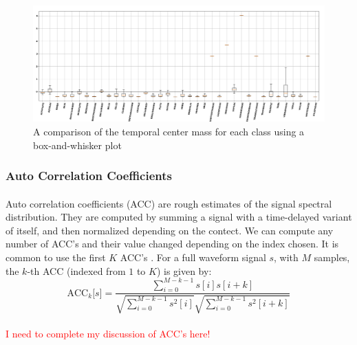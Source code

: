 \documentclass[12pt,letterpaper]{article}
\begin{document}
\begin{figure}[H]
\begin{center}
\includegraphics[scale=0.3]{../FiguresFeatures/Time_Center_of_Mass}
\end{center}
\caption{A comparison of the temporal center mass for each class using a box-and-whisker plot}
\label{fig-FeatureTCM}
\end{figure}


\subsubsection{Auto Correlation Coefficients}

\paragraph*{}Auto correlation coefficients (ACC) are rough estimates of the signal spectral distribution. They are computed by summing a signal with a time-delayed variant of itself, and then normalized depending on the contect. We can compute any number of ACC's and their value changed depending on the index chosen. It is common to use the first $K$ ACC's \cite{Serizel}. For a full waveform signal $s$, with $M$ samples, the $k$-th ACC (indexed from $1$ to $K$) is given by:
\begin{equation}
\label{eqn-FeatureACC}
\text{ACC}_k\big[ s \big] = 
\frac{\sum_{i=0}^{M-k-1}s[i]s[i+k]} {\sqrt{\sum_{i=0}^{M-k-1}s^2[i]} 
\sqrt{\sum_{i=0}^{M-k-1}s^2[i+k]}}
\end{equation}

\paragraph*{}\textcolor{red}{I need to complete my discussion of ACC's here!}
\end{document}
